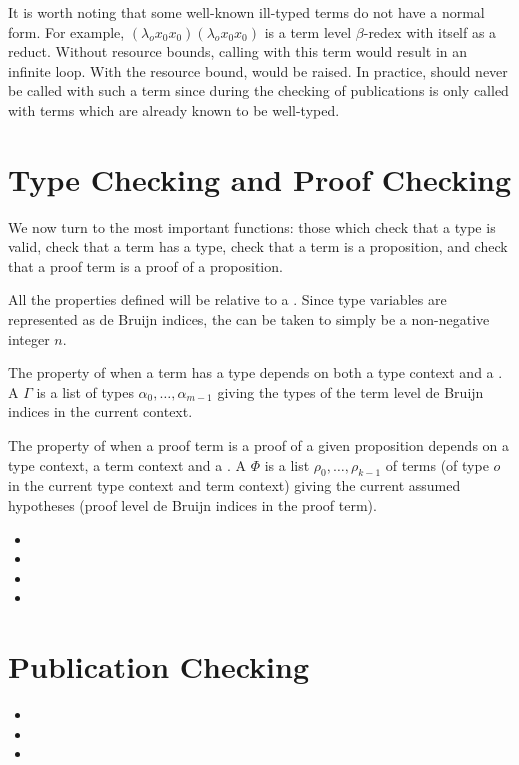 It is worth noting that some well-known ill-typed terms do not have a normal form.
For example, $(\lambda_o x_0 x_0) (\lambda_o x_0 x_0)$ is a term level $\beta$-redex
with itself as a reduct. Without resource bounds, calling {}
with this term would result in an infinite loop. With the resource bound, {}
would be raised.
In practice, {} should never be called with such a term
since during the checking of publications {} is only
called with terms which are already known to be well-typed.

\section{Type Checking and Proof Checking}

We now turn to the most important functions: those which check that a type
is valid, check that a term has a type, check that a term is a proposition,
and check that a proof term is a proof of a proposition.

All the properties defined will be relative to a
{}.
Since type variables are represented
as de Bruijn indices, the {}
can be taken to simply be a non-negative integer $n$.

The property of when a term has a type
depends on both a type context and a {}.
A {} $\Gamma$ is a list of types
$\alpha_0,\ldots,\alpha_{m-1}$
giving the types of the term level de Bruijn indices
in the current context.

The property of when a proof term is a proof of a given
proposition depends on a type context, a term context
and a {}.
A {} $\Phi$ is a list
$\rho_0,\ldots,\rho_{k-1}$
of terms (of type $o$ in the current type context
and term context)
giving the current assumed hypotheses
(proof level de Bruijn indices in the proof term).

\begin{itemize}
\item {}
\item {}
\item {}
\item {}
\end{itemize}

\section{Publication Checking}

\begin{itemize}
\item {}
\item {}
\item {}
\end{itemize}
